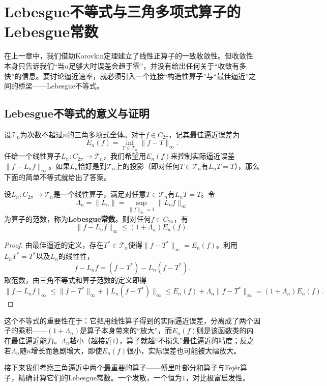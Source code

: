 \section{Lebesgue不等式与三角多项式算子的Lebesgue常数}

在上一章中，我们借助Korovkin定理建立了线性正算子的一致收敛性。但收敛性本身只告诉我们“当$n$足够大时误差会趋于零”，并没有给出任何关于“收敛有多快”的信息。要讨论逼近速率，就必须引入一个连接“构造性算子”与“最佳逼近”之间的桥梁——Lebesgue不等式。

\subsection{Lebesgue不等式的意义与证明}

设$\mathcal{T}_n$为次数不超过$n$的三角多项式全体。对于$f\in C_{2\pi}$，记其最佳逼近误差为
\[
E_n(f)=\inf_{T\in\mathcal{T}_n}\|f-T\|_\infty.
\]
任给一个线性算子$L_n:C_{2\pi}\to\mathcal{T}_n$，我们希望用$E_n(f)$来控制实际逼近误差$\|f-L_nf\|_\infty$。如果$L_n$恰好是到$\mathcal{T}_n$上的投影（即对任何$T\in\mathcal{T}_n$有$L_nT=T$），那么下面的简单不等式就给出了答案。

\begin{theorem}[Lebesgue不等式]
设$L_n:C_{2\pi}\to\mathcal{T}_n$是一个线性算子，满足对任意$T\in\mathcal{T}_n$有$L_nT=T$。令
\[
\Lambda_n=\|L_n\|=\sup_{\|f\|_\infty=1}\|L_nf\|_\infty
\]
为算子的范数，称为\textbf{Lebesgue常数}。则对任何$f\in C_{2\pi}$，有
\[
\|f-L_nf\|_\infty\le (1+\Lambda_n)E_n(f).
\]
\end{theorem}

\begin{proof}
由最佳逼近的定义，存在$T^*\in\mathcal{T}_n$使得$\|f-T^*\|_\infty=E_n(f)$。利用$L_nT^*=T^*$以及$L_n$的线性性，
\[
f-L_nf=(f-T^*)-L_n(f-T^*).
\]
取范数，由三角不等式和算子范数的定义即得
\[
\|f-L_nf\|_\infty\le\|f-T^*\|_\infty+\|L_n(f-T^*)\|_\infty
\le E_n(f)+\Lambda_n\|f-T^*\|_\infty=(1+\Lambda_n)E_n(f).
\]
\end{proof}

这个不等式的重要性在于：它把用线性算子得到的实际逼近误差，分离成了两个因子的乘积——$(1+\Lambda_n)$是算子本身带来的“放大”，而$E_n(f)$则是该函数类的内在最佳逼近能力。$\Lambda_n$越小（越接近$1$），算子就越“不损失”最佳逼近的精度；反之若$\Lambda_n$随$n$增长而急剧增大，即使$E_n(f)$很小，实际误差也可能被大幅放大。

接下来我们考察三角逼近中两个最重要的算子——傅里叶部分和算子与Fejér算子，精确计算它们的Lebesgue常数。一个发散，一个恒为$1$，对比极富启发性。

